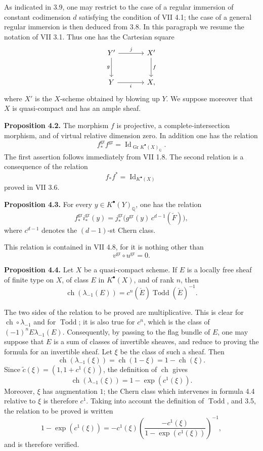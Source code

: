 \documentclass[11pt]{article}
\newcommand{\Gr}{\operatorname{Gr}}
\newcommand{\ch}{\operatorname{ch}}
\newcommand{\Todd}{\operatorname{Todd}}
\providecommand{\ch}{\operatorname{ch}}
\providecommand{\Todd}{\operatorname{Todd}}
\providecommand{\Gr}{\operatorname{Gr}}
\providecommand{\Gr}{\operatorname{G}}
\begin{document}
As indicated in 3.9, one may restrict to the case of a regular immersion of constant codimension \(d\) satisfying the condition of VII 4.1; the case of a general regular immersion is then deduced from 3.8. In this paragraph we resume the notation of VII 3.1. Thus one has the Cartesian square
\[
\begin{tikzcd}[column sep=large,row sep=large]
Y' \arrow[r,"j"] \arrow[d,"g"'] & X' \arrow[d,"f"]\\
Y \arrow[r,"i"'] & X ,
\end{tikzcd}
\]
where \(X'\) is the \(X\)-scheme obtained by blowing up \(Y\). We suppose moreover that \(X\) is quasi-compact and has an ample sheaf.

\textbf{Proposition 4.2.} The morphism \(f\) is projective, a complete-intersection morphism, and of virtual relative dimension zero. In addition one has the relation
\[
 f^{\mathrm{gr}}_* f^{\mathrm{gr}}=\operatorname{Id}_{\Gr K^{\bullet}(X)_{\mathbb Q}} .
\]
The first assertion follows immediately from VII 1.8. The second relation is a consequence of the relation
\[
 f_*f^*=\operatorname{Id}_{K^{\bullet}(X)}
\]
proved in VII 3.6.

\textbf{Proposition 4.3.} For every \(y\in K^{\bullet}(Y)_{\mathbb Q}\), one has the relation
\[
 f^{\mathrm{gr}}_* i^{\mathrm{gr}}_*(y)
 =
 j^{\mathrm{gr}}_*\bigl(g^{\mathrm{gr}}(y)\,c^{d-1}(\check F)\bigr),
\]
where \(c^{d-1}\) denotes the \((d-1)\)-st Chern class.

This relation is contained in VII 4.8, for it is nothing other than
\[
 v^{\mathrm{gr}}\circ u^{\mathrm{gr}}=0 .
\]

\textbf{Proposition 4.4.} Let \(X\) be a quasi-compact scheme. If \(E\) is a locally free sheaf of finite type on \(X\), of class \(E\) in \(K^{\bullet}(X)\), and of rank \(n\), then
\[
 \ch(\lambda_{-1}(E))=c^n(\check E)\Todd(\check E)^{-1}.
\]

The two sides of the relation to be proved are multiplicative. This is clear for \(\ch\circ\lambda_{-1}\) and for \(\Todd\); it is also true for \(c^n\), which is the class of \((-1)^nE\lambda_{-1}(E)\). Consequently, by passing to the flag bundle of \(E\), one may suppose that \(E\) is a sum of classes of invertible sheaves, and reduce to proving the formula for an invertible sheaf. Let \(\xi\) be the class of such a sheaf. Then
\[
 \ch(\lambda_{-1}(\xi))=\ch(1-\xi)=1-\ch(\xi).
\]
Since \(\widetilde c(\xi)=(1,1+c^1(\xi))\), the definition of \(\ch\) gives
\[
 \ch(\lambda_{-1}(\xi))=1-\exp(c^1(\xi)).
\]
Moreover, \(\xi\) has augmentation \(1\); the Chern class which intervenes in formula 4.4 relative to \(\xi\) is therefore \(c^1\). Taking into account the definition of \(\Todd\), and 3.5, the relation to be proved is written
\[
 1-\exp(c^1(\xi))
 =
 -c^1(\xi)\left(\frac{-c^1(\xi)}{1-\exp(c^1(\xi))}\right)^{-1},
\]
and is therefore verified.
\end{document}
